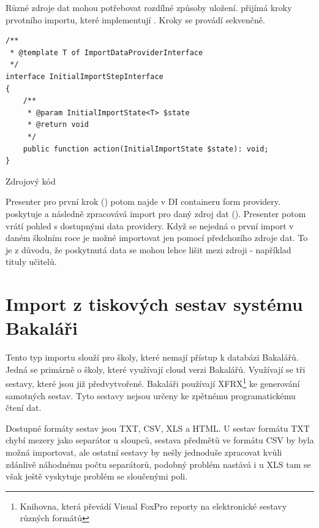 Různé zdroje dat mohou potřebovat rozdílné způsoby uložení.  přijímá kroky prvotního importu, které implementují . Kroky se provádí sekvenčně.

\begin{code}[H]

  \begin{verbatim}
/**
 * @template T of ImportDataProviderInterface
 */
interface InitialImportStepInterface
{
    /**
     * @param InitialImportState<T> $state
     * @return void
     */
    public function action(InitialImportState $state): void;
}
   \end{verbatim}
  \caption{Zdrojový kód }

\end{code}


Presenter pro první krok () potom najde v DI containeru form providery.
 poskytuje a následně zpracovává import pro daný zdroj dat ().
Presenter potom vrátí pohled s dostupnými data providery.
Když se nejedná o první import v daném školním roce je možné importovat jen pomocí předchozího zdroje dat.
To je z důvodu, že poskytnutá data se mohou lehce lišit mezi zdroji - například tituly učitelů. 





\section{Import z tiskových sestav systému Bakaláři}
Tento typ importu slouží pro školy, které nemají přístup k databázi Bakalářů. 
Jedná se primárně o školy, které využívají cloud verzi Bakalářů. Využívají se tři sestavy, které jsou již předvytvořené. Bakaláři používají XFRX\footnote{Knihovna, která převádí Visual FoxPro reporty na elektronické sestavy různých formátů} ke generování samotných sestav. Tyto sestavy nejsou určeny ke zpětnému programatickému čtení dat.

Dostupné formáty sestav jsou TXT, CSV, XLS a HTML. U sestav formátu TXT chybí mezery jako separátor u sloupců, sestava předmětů ve formátu CSV by byla možná importovat, ale ostatní sestavy by nešly jednoduše zpracovat kvůli zdánlivě náhodnému počtu separátorů, podobný problém nastává i u XLS tam se však ještě vyskytuje problém se sloučenými poli.

